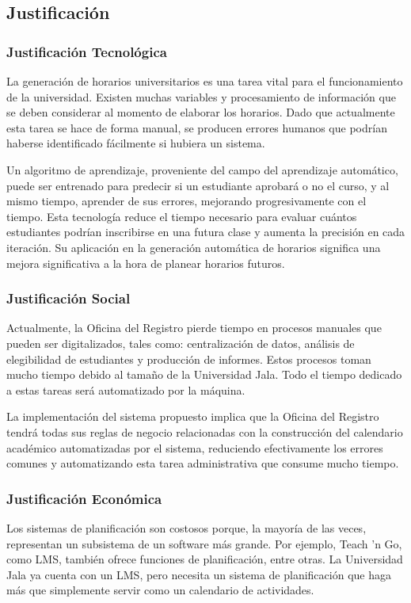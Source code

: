 \subsection{Justificación}

\subsubsection{Justificación Tecnológica}
La generación de horarios universitarios es una tarea vital para el funcionamiento de la universidad.
Existen muchas variables y procesamiento de información que se deben considerar al momento de elaborar los horarios. Dado que actualmente esta tarea se hace de forma manual, se producen errores humanos que podrían haberse identificado fácilmente si hubiera un sistema.

Un algoritmo de aprendizaje, proveniente del campo del aprendizaje automático, puede ser entrenado para predecir si un estudiante aprobará o no el curso, y al mismo tiempo, aprender de sus errores, mejorando progresivamente con el tiempo.
Esta tecnología reduce el tiempo necesario para evaluar cuántos estudiantes podrían inscribirse en una futura clase y aumenta la precisión en cada iteración. Su aplicación en la generación automática de horarios significa una mejora significativa a la hora de planear horarios futuros.

\subsubsection{Justificación Social}

Actualmente, la Oficina del Registro pierde tiempo en procesos manuales que pueden ser digitalizados, tales como: centralización de datos, análisis de elegibilidad de estudiantes y producción de informes.
Estos procesos toman mucho tiempo debido al tamaño de la Universidad Jala. Todo el tiempo dedicado a estas tareas será automatizado por la máquina.

La implementación del sistema propuesto implica que la Oficina del Registro tendrá todas sus reglas de negocio relacionadas con la construcción del calendario académico automatizadas por el sistema, reduciendo efectivamente los errores comunes y automatizando esta tarea administrativa que consume mucho tiempo.

\subsubsection{Justificación Económica}
Los sistemas de planificación son costosos porque, la mayoría de las veces, representan un subsistema de un software más grande.
Por ejemplo, Teach 'n Go, como LMS, también ofrece funciones de planificación, entre otras. La Universidad Jala ya cuenta con un LMS, pero necesita un sistema de planificación que haga más que simplemente servir como un calendario de actividades.

